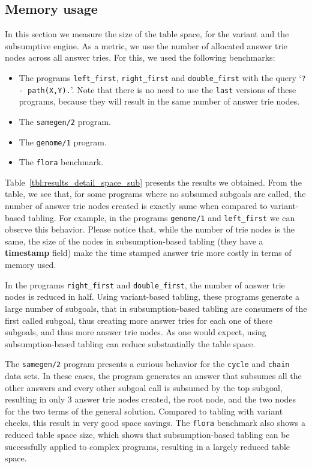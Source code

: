 


\subsection{Memory usage}

In this section we measure the size of the table space, for the variant and the subsumptive engine.
As a metric, we use the number of allocated answer trie nodes across all answer tries.
For this, we used the following benchmarks:

\begin{itemize}
   \item The programs \texttt{left\_first}, \texttt{right\_first} and \texttt{double\_first} with the query `\texttt{?-~path(X,Y).}'. Note that there is no need to use
   the \texttt{last} versions of these programs, because they will result in the same number of answer trie nodes.
   
   \item The \texttt{samegen/2} program.
   
   \item The \texttt{genome/1} program.
   
   \item The \texttt{flora} benchmark.
\end{itemize}

Table~\ref{tbl:results_detail_space_sub} presents the results we obtained. From the table, we see that,
for some programs where no subsumed subgoals are called, the number of answer trie nodes created is
exactly same when compared to variant-based tabling. For example, in the programs \texttt{genome/1} and
\texttt{left\_first} we can observe this behavior. Please notice that, while the number of trie nodes is
the same, the size of the nodes in subsumption-based tabling (they have a \textbf{timestamp} field) make
the time stamped answer trie more costly in terms of memory used.

In the programs \texttt{right\_first} and \texttt{double\_first}, the number of answer trie nodes
is reduced in half. Using variant-based tabling, these programs generate a large number of subgoals,
that in subsumption-based tabling are consumers of the first called subgoal, thus creating more
answer tries for each one of these subgoals, and thus more answer trie nodes. As one would expect,
using subsumption-based tabling can reduce substantially the table space.

The \texttt{samegen/2} program presents a curious behavior for the \texttt{cycle} and \texttt{chain}
data sets. In these cases, the program generates an answer that subsumes all the other answers and
every other subgoal call is subsumed by the top subgoal, resulting in only 3 answer trie nodes created,
the root node, and the two nodes for the two terms of the general solution. Compared to tabling with
variant checks, this result in very good space savings.
The \texttt{flora} benchmark also shows a reduced table space size, which shows that subsumption-based
tabling can be successfully applied to complex programs, resulting in a largely reduced
table space.

